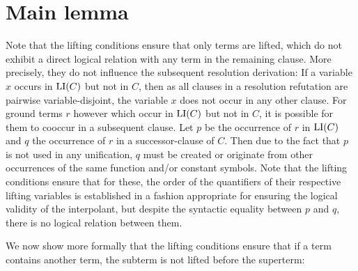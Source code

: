 




\section{Main lemma}
Note that the lifting conditions ensure that only terms are lifted,
which do not exhibit a direct logical relation with any term in the remaining clause.
More precisely, they do not influence the subsequent resolution derivation: 
If a variable $x$ occurs in $\operatorname{LI}(C)$ but not in $C$, then as all clauses in a resolution refutation are pairwise variable-disjoint, the variable $x$ does not occur in any other clause.
For ground terms $r$ however which occur in $\operatorname{LI}(C)$ but not in $C$,
it is possible for them to cooccur in a subsequent clause. Let $p$ be the occurrence of $r$ in $\operatorname{LI}(C)$ and $q$ the occurrence of $r$ in a successor-clause of $C$.
Then due to the fact that $p$ is not used in any unification, 
$q$ must be created or originate from other occurrences of the same function and/or constant symbols.
Note that the lifting conditions ensure that for these, the order of the quantifiers of their respective lifting variables is established in a fashion appropriate for ensuring the logical validity of the interpolant, but despite the syntactic equality between $p$ and $q$, there is no logical relation between them.

We now show more formally that the lifting conditions ensure that if a term contains another term, the subterm is not lifted before the superterm:


